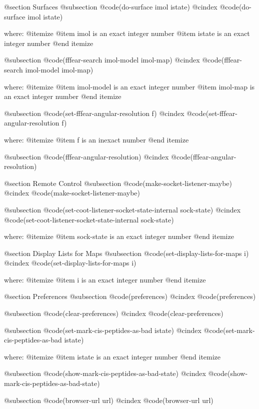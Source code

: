 @section Surfaces 
@subsection @code{(do-surface imol istate)}
@cindex @code{(do-surface imol istate)}
 
where: 
 @itemize 
     @item imol is an exact integer number
     @item istate is an exact integer number
 @end itemize


@subsection @code{(fffear-search imol-model imol-map)}
@cindex @code{(fffear-search imol-model imol-map)}
 
where: 
 @itemize 
     @item imol-model is an exact integer number
     @item imol-map is an exact integer number
 @end itemize


@subsection @code{(set-fffear-angular-resolution f)}
@cindex @code{(set-fffear-angular-resolution f)}
 
where: 
 @itemize 
     @item f is an inexact number
 @end itemize


@subsection @code{(fffear-angular-resolution)}
@cindex @code{(fffear-angular-resolution)}
 

@section Remote Control 
@subsection @code{(make-socket-listener-maybe)}
@cindex @code{(make-socket-listener-maybe)}
 
@subsection @code{(set-coot-listener-socket-state-internal sock-state)}
@cindex @code{(set-coot-listener-socket-state-internal sock-state)}
 
where: 
 @itemize 
     @item sock-state is an exact integer number
 @end itemize



@section Display Lists for Maps 
@subsection @code{(set-display-lists-for-maps i)}
@cindex @code{(set-display-lists-for-maps i)}
 
where: 
 @itemize 
     @item i is an exact integer number
 @end itemize



@section Preferences 
@subsection @code{(preferences)}
@cindex @code{(preferences)}
 
@subsection @code{(clear-preferences)}
@cindex @code{(clear-preferences)}
 
@subsection @code{(set-mark-cis-peptides-as-bad istate)}
@cindex @code{(set-mark-cis-peptides-as-bad istate)}
 
where: 
 @itemize 
     @item istate is an exact integer number
 @end itemize


@subsection @code{(show-mark-cis-peptides-as-bad-state)}
@cindex @code{(show-mark-cis-peptides-as-bad-state)}
 
@subsection @code{(browser-url url)}
@cindex @code{(browser-url url)}
 
